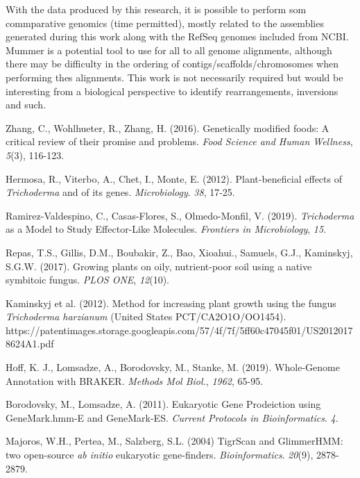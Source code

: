 \documentclass[12pt]{article}
\begin{document}
With the data produced by this research, it is possible to perform som
commparative genomics (time permitted), mostly related to the
assemblies generated during this work along with the RefSeq genomes
included from NCBI. Mummer is a potential tool to use for all to all
genome alignments, although there may be difficulty in the ordering of
contigs/scaffolds/chromosomes when performing thes alignments. This
work is not necessarily required but would be interesting from a
biological perspective to identify rearrangements, inversions and
such.

\begin{thebibliography}{99}
 Zhang, C., Wohlhueter, R., Zhang, H. (2016). Genetically
  modified foods: A critical review of their promise and
  problems. \textit{Food Science and Human Wellness}, \textit{5}(3),
  116-123.

 Hermosa, R., Viterbo, A., Chet, I., Monte,
  E. (2012). Plant-beneficial effects of \textit{Trichoderma} and of
  its genes. \textit{Microbiology}. \textit{38},
  17-25. 

 Ramirez-Valdespino, C., Casas-Flores, S.,
  Olmedo-Monfil, V. (2019). \textit{Trichoderma} as a Model to Study
  Effector-Like Molecules. \textit{Frontiers in Microbiology}, \textit{15}.

 Repas, T.S., Gillis, D.M., Boubakir, Z., Bao,
  Xioahui., Samuels, G.J., Kaminskyj, S.G.W. (2017). Growing plants on
  oily, nutrient-poor soil using a native symbitoic
  fungus. \textit{PLOS ONE}, \textit{12}(10).

 Kaminskyj et al. (2012). Method for increasing
  plant growth using the fungus \textit{Trichoderma harzianum} (United
  States PCT/CA2O1O/OO1454). https://patentimages.storage.googleapis.com/57/4f/7f/5ff60c47045f01/US20120178624A1.pdf
  
 Hoff, K. J., Lomsadze, A., Borodovsky, M., Stanke,
  M. (2019). Whole-Genome Annotation with BRAKER. \textit{Methods Mol
    Biol.}, \textit{1962}, 65-95.

 Borodovsky, M., Lomsadze, A. (2011). Eukaryotic
  Gene Prodeiction using GeneMark.hmm-E and
  GeneMark-ES. \textit{Current Protocols in
    Bioinformatics}. \textit{4}.

 Majoros, W.H., Pertea, M., Salzberg, S.L. (2004) TigrScan and
  GlimmerHMM: two open-source \textit{ab initio} eukaryotic
  gene-finders. \textit{Bioinformatics}. \textit{20}(9), 2878-2879.
  

\end{thebibliography}
\end{document}

